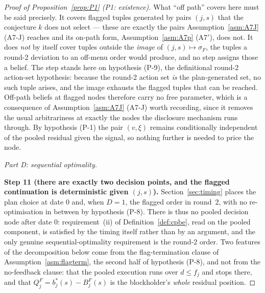 \begin{proof}[Proof of Proposition~\ref{prop:P1} (P1: existence)]
What ``off path'' covers here must be said precisely. It covers flagged tuples generated by pairs
$(j,s)$ that the conjecture $k$ does not select --- these are exactly the pairs
Assumption~\ref{asm:A7J} (A7-J) reaches and its on-path form, Assumption~\ref{asm:A7p} (A7$'$), does not. It does
\emph{not} by itself cover tuples outside the \emph{image} of $(j,s) \mapsto \sigma_F$, the tuples a
round-2 deviation to an off-menu order would produce, and no step assigns those a belief. The step
stands here on hypothesis (P-9), the definitional round-2 action-set hypothesis: because the round-2
action set \emph{is} the plan-generated set, no such tuple arises, and the image exhausts the flagged
tuples that can be reached. Off-path beliefs at flagged nodes therefore carry no free parameter,
which is a consequence of Assumption~\ref{asm:A7J} (A7-J) worth recording, since it removes the usual
arbitrariness at exactly the nodes the disclosure mechanism runs through. By hypothesis (P-1) the
pair $(v,\xi)$ remains conditionally independent of the pooled residual given the signal, so nothing
further is needed to price the node.

\medskip
\noindent\emph{Part D: sequential optimality.}

\smallskip
\noindent\textbf{Step 11 (there are exactly two decision points, and the flagged continuation is
deterministic given $(j,s)$).}
Section~\ref{sec:timing} places the plan choice at date $0$ and, when $D = 1$, the flagged order in
round~2, with no re-optimisation in between by hypothesis (P-8). There is thus no pooled decision
node after date $0$: requirement~(ii) of Definition~\ref{def:cpbe}, read on the pooled component, is
satisfied by the timing itself rather than by an argument, and the only genuine sequential-optimality
requirement is the round-2 order. Two features of the decomposition below come from the
flag-termination clause of Assumption~\ref{asm:flagterm}, the second half of hypothesis (P-8), and
not from the no-feedback clause: that the pooled execution runs over $d \le f_j$ and stops there, and
that $Q_j^F = b_j^*(s)-B_j^F(s)$ is the blockholder's \emph{whole} residual position.


\end{proof}
